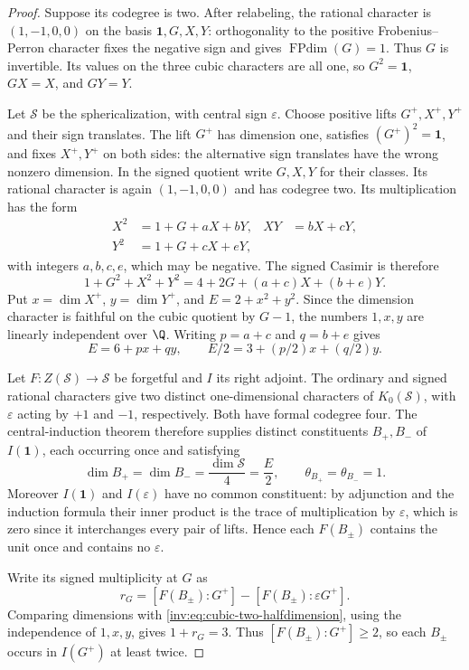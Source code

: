 \begin{proof}
Suppose its codegree is two. After relabeling, the rational character is
$(1,-1,0,0)$ on the basis $\mathbf1,G,X,Y$: orthogonality to the positive
Frobenius--Perron character fixes the negative sign and gives
$\operatorname{FPdim}(G)=1$. Thus $G$ is invertible. Its values on the
three cubic characters are all one, so $G^2=\mathbf1$, $GX=X$, and $GY=Y$.

Let $\mathcal S$ be the sphericalization, with central sign $\varepsilon$.
Choose positive lifts $G^+,X^+,Y^+$ and their sign translates.
The lift $G^+$ has dimension one, satisfies $(G^+)^2=\mathbf1$, and fixes
$X^+,Y^+$ on both sides: the alternative sign translates have the wrong
nonzero dimension. In the signed quotient write $G,X,Y$ for their
classes. Its rational character is again $(1,-1,0,0)$ and has codegree
two. Its multiplication has the form
\[
 \begin{aligned}
 X^2&=1+G+aX+bY,& XY&=bX+cY,\\
 Y^2&=1+G+cX+eY,
 \end{aligned}
\]
with integers $a,b,c,e$, which may be negative. The signed Casimir is
therefore
\[
 1+G^2+X^2+Y^2=4+2G+(a+c)X+(b+e)Y.
\]
Put $x=\dim X^+$, $y=\dim Y^+$, and $E=2+x^2+y^2$.
Since the dimension character is faithful on the cubic quotient by
$G-1$, the numbers $1,x,y$ are linearly independent over $\Q$.
Writing $p=a+c$ and $q=b+e$ gives
\begin{equation}\label{inv:eq:cubic-two-halfdimension}
 E=6+px+qy,\qquad E/2=3+(p/2)x+(q/2)y.
\end{equation}

Let $F:Z(\mathcal S)\to\mathcal S$ be forgetful and $I$ its right
adjoint. The ordinary and signed rational characters give two distinct
one-dimensional characters of $K_0(\mathcal S)$, with $\varepsilon$
acting by $+1$ and $-1$, respectively. Both have formal codegree four.
The central-induction theorem therefore supplies distinct constituents
$B_+,B_-$ of $I(\mathbf1)$, each occurring once and satisfying
\[
 \dim B_+=\dim B_-=\frac{\dim\mathcal S}{4}=\frac E2,
 \qquad \theta_{B_+}=\theta_{B_-}=1.
\]
Moreover $I(\mathbf1)$ and $I(\varepsilon)$ have no common constituent:
by adjunction and the induction formula their inner product is the
trace of multiplication by $\varepsilon$, which is zero since it
interchanges every pair of lifts. Hence each $F(B_\pm)$ contains the
unit once and contains no $\varepsilon$.

Write its signed multiplicity at $G$ as
\[
 r_G=[F(B_\pm):G^+]-[F(B_\pm):\varepsilon G^+].
\]
Comparing dimensions with \eqref{inv:eq:cubic-two-halfdimension}, using
the independence of $1,x,y$, gives $1+r_G=3$. Thus
$[F(B_\pm):G^+]\ge2$, so each $B_\pm$ occurs in $I(G^+)$ at least twice.


\end{proof}
